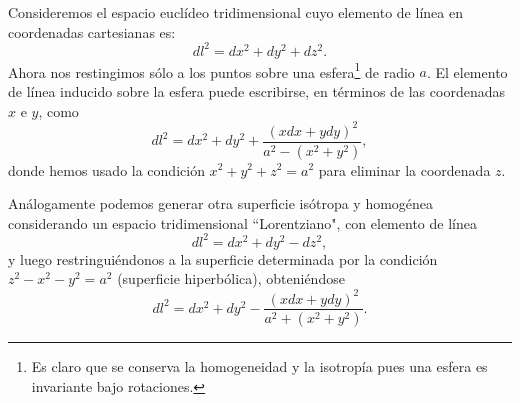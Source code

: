 Consideremos el espacio euclídeo tridimensional cuyo elemento de línea en coordenadas cartesianas es:
\begin{equation}
dl^{2}= dx^{2} + dy^{2} + dz^{2}.
\end{equation}
Ahora nos restingimos sólo a los puntos sobre una esfera\footnote{Es claro que se conserva la homogeneidad y la isotropía pues una esfera es invariante bajo rotaciones.} de radio $a$. El elemento de línea inducido sobre la esfera puede escribirse, en términos de las coordenadas $x$ e $y$, como
\begin{equation}
dl^{2}= dx^{2} + dy^{2} + \frac{(xdx + ydy)^{2}}{a^2-(x^2 + y^2)},
\end{equation}
donde hemos usado la condición $x^2 +y^2 + z^2 =a^2$ para eliminar la coordenada $z$.

Análogamente podemos generar otra superficie isótropa y homogénea considerando un espacio tridimensional ``Lorentziano", con elemento de línea
\begin{equation}
dl^{2}= dx^{2} + dy^{2}  -dz^{2},
\end{equation}
y luego restringuiéndonos a la superficie determinada por la condición $z^2-x^2-y^2=a^2$ (superficie hiperbólica), obteniéndose
\begin{equation}
dl^{2}= dx^{2} + dy^{2} - \frac{(xdx + ydy)^{2}}{a^2+(x^2 + y^2)}.
\end{equation}

